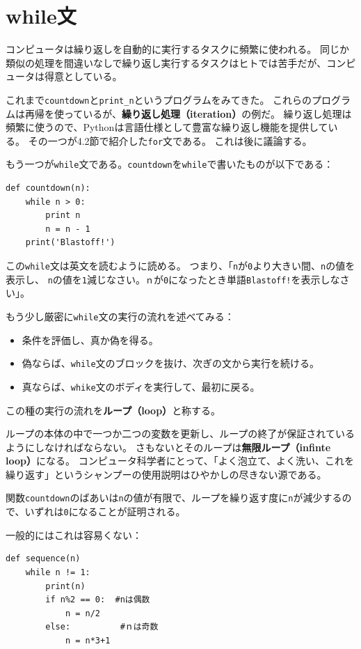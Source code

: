 \documentclass[a4j,12pt,makeidx]{jbook}
\begin{document}
\section{while文}
コンピュータは繰り返しを自動的に実行するタスクに頻繁に使われる。
同じか類似の処理を間違いなしで繰り返し実行するタスクはヒトでは苦手だが、コンピュータは得意としている。\par
これまで{\tt countdown}と{\tt print\_n}というプログラムをみてきた。
これらのプログラムは再帰を使っているが、{\bf 繰り返し処理（iteration）}の例だ。
繰り返し処理は頻繁に使うので、Pythonは言語仕様として豊富な繰り返し機能を提供している。
その一つが4.2節で紹介した{\tt for}文である。
これは後に議論する。\par
もう一つが{\tt while}文である。{\tt countdown}を{\tt while}で書いたものが以下である：
\begin{verbatim}
def countdown(n):
    while n > 0:
        print n
        n = n - 1
    print('Blastoff!')
\end{verbatim}
この{\tt while}文は英文を読むように読める。
つまり、「{\tt n}が{\tt 0}より大きい間、{\tt n}の値を表示し、
{\tt n}の値を{\tt 1}減じなさい。{\tt ｎ}が{\tt 0}になったとき単語{\tt Blastoff!}を表示しなさい」。\par
もう少し厳密に{\tt while}文の実行の流れを述べてみる：
\begin{itemize}
\item 条件を評価し、真か偽を得る。
\item 偽ならば、{\tt while}文のブロックを抜け、次ぎの文から実行を続ける。
\item 真ならば、{\tt whike}文のボディを実行して、最初に戻る。
\end{itemize}
この種の実行の流れを{\bf ループ（loop）}と称する。 \par
ループの本体の中で一つか二つの変数を更新し、ループの終了が保証されているようにしなければならない。
さもないとそのループは{\bf 無限ループ（infinte loop）}になる。
コンピュータ科学者にとって、「よく泡立て、よく洗い、これを繰り返す」というシャンプーの使用説明はひやかしの尽きない源である。\par
関数{\tt countdown}のばあいは{\tt n}の値が有限で、ループを繰り返す度に{\tt n}が減少するので、いずれは{\tt 0}になることが証明される。 \par
一般的にはこれは容易くない：
\begin{verbatim}
def sequence(n)
    while n != 1:
        print(n)
        if n%2 == 0:  #nは偶数
            n = n/2
        else:          #ｎは奇数
            n = n*3+1
\end{verbatim}
\end{document}

